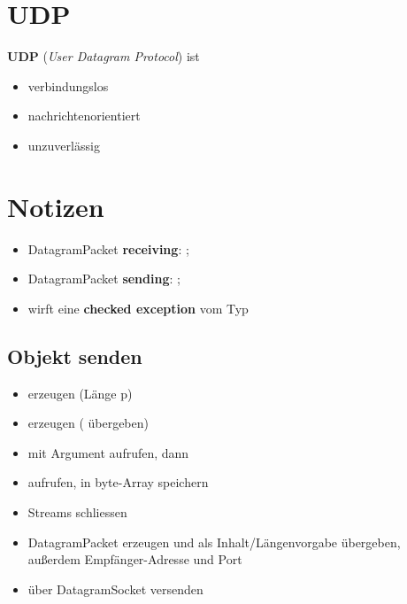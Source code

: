\section{UDP}

\textbf{UDP} (\textit{User Datagram Protocol}) ist

\begin{itemize}
    \item verbindungslos
    \item nachrichtenorientiert
    \item unzuverlässig
\end{itemize}


\section*{Notizen}

\begin{itemize}
    \item DatagramPacket \textbf{receiving}: ;
    \item DatagramPacket \textbf{sending}: ;
    \item {} wirft eine \textbf{checked exception} vom Typ 
\end{itemize}

\subsection*{Objekt senden}
\begin{itemize}
    \item {}  erzeugen (Länge p)
    \item {}  erzeugen ( übergeben)
    \item {} mit Argument aufrufen, dann 
    \item {} aufrufen, in byte-Array  speichern
    \item Streams schliessen
    \item DatagramPacket erzeugen und  als Inhalt/Längenvorgabe übergeben, außerdem Empfänger-Adresse und Port
    \item über DatagramSocket versenden
\end{itemize}


